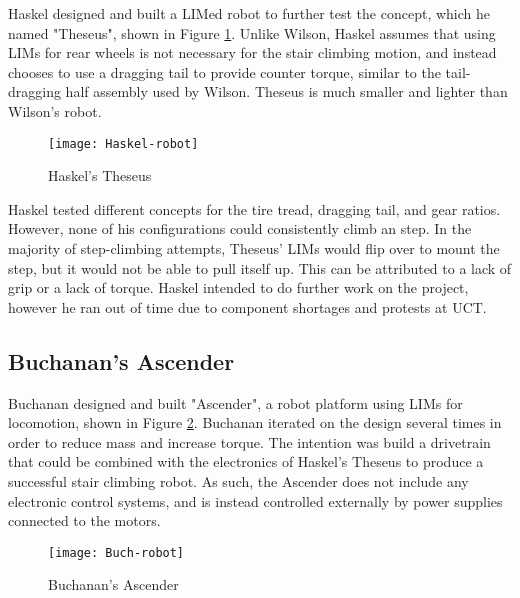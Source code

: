 Haskel designed and built a LIMed robot to further test the concept, which he named "Theseus", shown in Figure \ref{Haskel robot}. Unlike Wilson, Haskel assumes that using LIMs for rear wheels is not necessary for the stair climbing motion, and instead chooses to use a dragging tail to provide counter torque, similar to the tail-dragging half assembly used by Wilson. Theseus is much smaller and lighter than Wilson's robot.

\begin{figure}[h]
	\centering
	\texttt{[image: Haskel-robot]}
	\caption{Haskel's Theseus \citep{Haskel-2017}}
	\label{Haskel robot}
\end{figure}

Haskel tested different concepts for the tire tread, dragging tail, and gear ratios. However, none of his configurations could consistently climb an step. In the majority of step-climbing attempts, Theseus' LIMs would flip over to mount the step, but it would not be able to pull itself up. This can be attributed to a lack of grip or a lack of torque. Haskel intended to do further work on the project, however he ran out of time due to component shortages and protests at UCT.

\subsection{Buchanan's Ascender} %

Buchanan designed and built "Ascender", a robot platform using LIMs for locomotion, shown in Figure \ref{Buch robot}. Buchanan iterated on the design several times in order to reduce mass and increase torque. The intention was build a drivetrain that could be combined with the electronics of Haskel's Theseus to produce a successful stair climbing robot. As such, the Ascender does not include any electronic control systems, and is instead controlled externally by power supplies connected to the motors.

\begin{figure}[h]
	\centering
	\texttt{[image: Buch-robot]}
	\caption{Buchanan's Ascender \citep{Buchanan-2018}}
	\label{Buch robot}
\end{figure}

